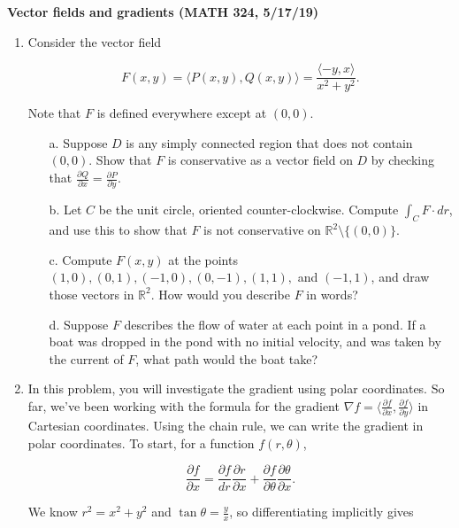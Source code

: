 \documentclass[11 pt]{report}
\begin{document}
\centerline{\bf Vector fields and gradients (MATH 324, 5/17/19)}

\begin{enumerate}  \item Consider the vector field 

$$F(x,y) = \langle P(x,y), Q(x,y) \rangle = \frac{\langle -y, x\rangle}{x^2+y^2}.$$

Note that $F$ is defined everywhere except at $(0,0)$. 

\begin{itemize} \item[a.] Suppose $D$ is any simply connected region that does not contain $(0,0)$. Show that $F$ is conservative as a vector field on $D$ by checking that $\frac{\partial Q}{\partial x} = \frac{\partial P}{\partial y}$. 

\item[b.] Let $C$ be the unit circle, oriented counter-clockwise. Compute $\int_C F \cdot dr$, and use this to show that $F$ is not conservative on $\mathbb{R}^2 \setminus \{(0,0)\}$. 

\item[c.] Compute $F(x,y)$ at the points $(1,0), (0,1), (-1,0), (0,-1), (1,1), $ and $(-1,1)$, and draw those vectors in $\mathbb{R}^2$. How would you describe $F$ in words? 

\item[d.] Suppose $F$ describes the flow of water at each point in a pond. If a boat was dropped in the pond with no initial velocity, and was taken by the current of $F$, what path would the boat take?

\newpage


\end{itemize}



\item In this problem, you will investigate the gradient using polar coordinates. So far, we've been working with the formula for the gradient $\nabla f = \langle \frac{\partial f}{\partial x}, \frac{\partial f}{\partial y}\rangle$ in Cartesian coordinates. Using the chain rule, we can write the gradient in polar coordinates. To start, for a function $f(r, \theta)$, 

$$\frac{\partial f}{\partial x} = \frac{\partial f}{d r} \frac{\partial r}{\partial x} + \frac{\partial f}{\partial \theta} \frac{\partial \theta}{\partial x}.$$

We know $r^2 = x^2 + y^2$ and $\tan \theta = \frac{y}{x}$, so differentiating implicitly gives


\end{enumerate}
\end{document}
